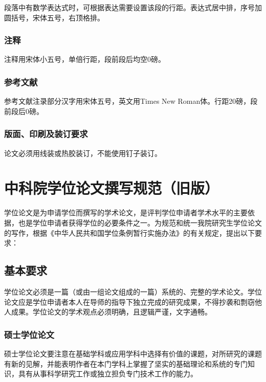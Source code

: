 \documentclass[a4paper,12pt,oneside,openany]{book}
\begin{document}
段落中有数学表达式时，可根据表达需要设置该段的行距。表达式居中排，序号加圆括号，宋体五号，右顶格排。 


\subsection{注释}

注释用宋体小五号，单倍行距，段前段后均空0磅。


\subsection{参考文献}

参考文献注录部分汉字用宋体五号，英文用Times New Roman体。行距20磅，段前段后0磅。


\subsection{版面、印刷及装订要求}



论文必须用线装或热胶装订，不能使用钉子装订。 

\backmatter





\appendix

\chapter{中科院学位论文撰写规范（旧版）}

学位论文是为申请学位而撰写的学术论文，是评判学位申请者学术水平的主要依据，也是学位申请者获得学位的必要条件之一。为规范和统一我院研究生学位论文的写作，根据《中华人民共和国学位条例暂行实施办法》的有关规定，提出以下要求：


\section{基本要求}

学位论文必须是一篇（或由一组论文组成的一篇）系统的、完整的学术论文。学位论文应是学位申请者本人在导师的指导下独立完成的研究成果，不得抄袭和剽窃他人成果。学位论文的学术观点必须明确，且逻辑严谨，文字通畅。


\subsection{硕士学位论文}

硕士学位论文要注意在基础学科或应用学科中选择有价值的课题，对所研究的课题有新的见解，并能表明作者在本门学科上掌握了坚实的基础理论和系统的专门知识，具有从事科学研究工作或独立担负专门技术工作的能力。
\end{document}
